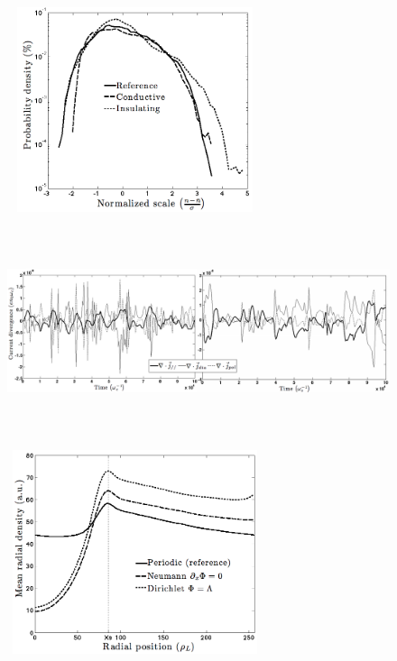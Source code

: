 \documentclass[a4paper,12pt]{article} %
\begin{document}
\thispagestyle{empty}

\begin{figure}[h!]
\center
\caption[PDF of density fluctuations at the center of the strip where the sheath current boundary conditions are modified. The scale of the x axis is the density fluctuations normalized to 
	the RMS value.]{}
\includegraphics[height=60mm,width=75mm]{figures/FigurePSI2012_5_P1-50_Futtersack.png}
\label{pdfN}
\end{figure}

\thispagestyle{empty}

\begin{figure}[h!]
\center
\caption[Contribution of the three main currents to the current balance equation as a function of time for the reference case (left) and for the enhanced sheath conductivity case at the center of the stripe of modified sheath conductivity.]{}
\includegraphics[height=60mm,width=160mm]{figures/FigurePSI2012_6_P1-50_Futtersack.png}
\label{currentDiv1}
\end{figure}


\thispagestyle{empty}



\begin{figure}[h!]
\center
\caption[Mean radial profile of SOL density. The loss of periodicity leads to the rise in $\bar{n}$.]{}
\includegraphics[height=60mm,width=75mm]{figures/FigurePSI2012_7_P1-50_Futtersack.png}
\label{profileN2}
\end{figure}
\end{document}

